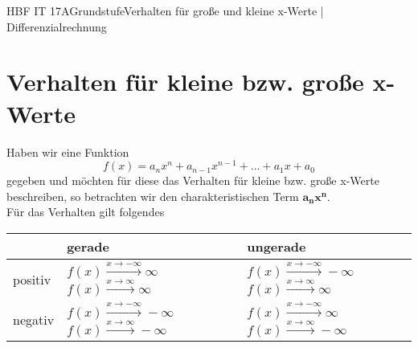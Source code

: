 \documentclass[11pt,twocolumn,oneside,openany,headings=optiontotoc,11pt,numbers=noenddot]{article}
\begin{document}
	\begin{worksheet}{HBF IT 17A}{Grundstufe}{Verhalten für große und kleine x-Werte | Differenzialrechnung}
		\section{Verhalten für kleine bzw. große x-Werte}
		Haben wir eine Funktion \[f(x) = a_nx^n + a_{n-1}x^{n-1} + \ldots + a_1x + a_0\] gegeben und möchten für diese das Verhalten für kleine bzw. große x-Werte beschreiben, so betrachten wir den charakteristischen Term \(\mathbf{a_nx^n}\).\\
		Für das Verhalten gilt folgendes\\
		\par\noindent
		\begin{tabular}{l|L{0.17\textwidth}|L{0.17\textwidth}}
			\hline
			 & gerade & ungerade\\
			\hline
			positiv &  & \\
			\hline
			negativ &  & \\
			\hline
		\end{tabular}

\end{worksheet}
\end{document}
